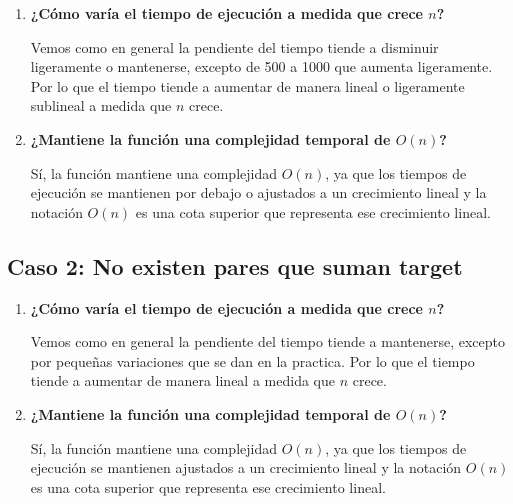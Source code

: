 \documentclass{article}
\begin{document}
\vspace{0.5cm}

\begin{enumerate}
    \item \textbf{¿Cómo varía el tiempo de ejecución a medida que crece $n$?}

    \vspace{0.5cm}
    
    Vemos como en general la pendiente del tiempo tiende a disminuir ligeramente o mantenerse, excepto de 500 a 1000 que aumenta ligeramente. Por lo que el tiempo tiende a aumentar de manera lineal o ligeramente sublineal a medida que $n$ crece.
    
\vspace{0.5cm}

    \item \textbf{¿Mantiene la función una complejidad temporal de $O(n)$?}
    \vspace{0.5cm}
    
    Sí, la función mantiene una complejidad $O(n)$, ya que los tiempos de ejecución se mantienen por debajo o ajustados a un crecimiento lineal y la notación $O(n)$ es una cota superior que representa ese crecimiento lineal.
\end{enumerate}

\vspace{1.5cm}

\subsection{Caso 2: No existen pares que suman target}

\vspace{0.5cm}

\begin{enumerate}
    \item \textbf{¿Cómo varía el tiempo de ejecución a medida que crece $n$?}

    \vspace{0.5cm}
    
    Vemos como en general la pendiente del tiempo tiende a mantenerse, excepto por pequeñas variaciones que se dan en la practica. Por lo que el tiempo tiende a aumentar de manera lineal a medida que $n$ crece.

    \item \textbf{¿Mantiene la función una complejidad temporal de $O(n)$?}
    \vspace{0.5cm}
    
    Sí, la función mantiene una complejidad $O(n)$, ya que los tiempos de ejecución se mantienen ajustados a un crecimiento lineal y la notación $O(n)$ es una cota superior que representa ese crecimiento lineal.
\end{enumerate}
\end{document}
